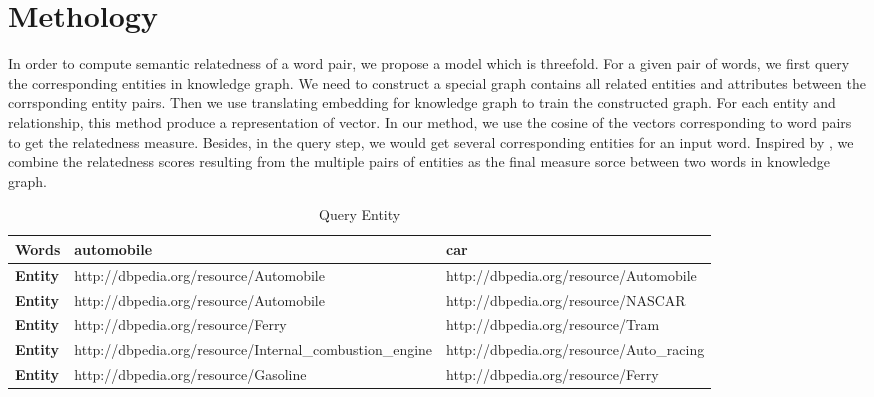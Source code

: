 \section{Methology}
In order to compute semantic relatedness of a word pair, we propose a model which is
threefold. 
For a given pair of words, we first query the corresponding entities in knowledge graph.
We need to construct a special graph contains all related entities and attributes between the 
corrsponding entity pairs.
Then we use translating embedding for knowledge graph to train the constructed 
graph. For each entity and relationship, this method produce a representation of vector.
In our method, we use the cosine of the vectors corresponding to word pairs to get the relatedness measure.
Besides, in the query step, we would get several corresponding entities for an input word. Inspired by
\cite{acl/IacobacciPN15}, we combine the relatedness scores resulting from the multiple pairs of entities 
as the final measure sorce between two words in knowledge graph.

\begin{table*}[]
    \small
    \centering
    \caption{Query Entity}
    \label{entities}
    \begin{tabular}{@{}|l|l|l|@{}}
    \toprule
    \textbf{Words}  & automobile                                               & car                                      \\ \midrule
    \textbf{Entity} & http://dbpedia.org/resource/Automobile                   & http://dbpedia.org/resource/Automobile   \\ \midrule
    \textbf{Entity} & http://dbpedia.org/resource/Automobile                   & http://dbpedia.org/resource/NASCAR       \\ \midrule
    \textbf{Entity} & http://dbpedia.org/resource/Ferry                        & http://dbpedia.org/resource/Tram         \\ \midrule
    \textbf{Entity} & http://dbpedia.org/resource/Internal\_combustion\_engine & http://dbpedia.org/resource/Auto\_racing \\ \midrule
    \textbf{Entity} & http://dbpedia.org/resource/Gasoline                     & http://dbpedia.org/resource/Ferry        \\ \bottomrule
    \end{tabular}    
\end{table*}

